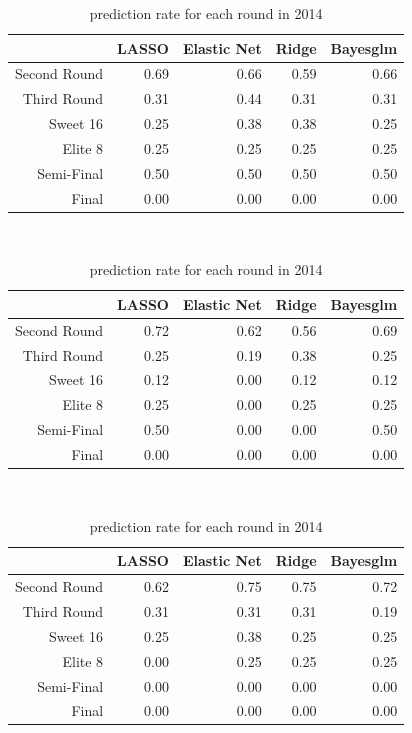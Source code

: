 \documentclass{article} %
\begin{document}
\begin{table}[H]
\centering
{\small
\begin{tabular}{rrrrr}
  \hline
 & LASSO & Elastic Net & Ridge & Bayesglm \\ 
  \hline
Second Round & 0.69 & 0.66 & 0.59 & 0.66 \\ 
  Third Round & 0.31 & 0.44 & 0.31 & 0.31 \\ 
  Sweet 16 & 0.25 & 0.38 & 0.38 & 0.25 \\ 
  Elite 8 & 0.25 & 0.25 & 0.25 & 0.25 \\ 
  Semi-Final & 0.50 & 0.50 & 0.50 & 0.50 \\ 
  Final & 0.00 & 0.00 & 0.00 & 0.00 \\ 
   \hline
\end{tabular}
}
\caption{prediction rate for each round in 2012}\ 

\centering
{\small
\begin{tabular}{rrrrr}
  \hline
 & LASSO & Elastic Net & Ridge & Bayesglm \\ 
  \hline
Second Round & 0.72 & 0.62 & 0.56 & 0.69 \\ 
  Third Round & 0.25 & 0.19 & 0.38 & 0.25 \\ 
  Sweet 16 & 0.12 & 0.00 & 0.12 & 0.12 \\ 
  Elite 8 & 0.25 & 0.00 & 0.25 & 0.25 \\ 
  Semi-Final & 0.50 & 0.00 & 0.00 & 0.50 \\ 
  Final & 0.00 & 0.00 & 0.00 & 0.00 \\ 
   \hline
\end{tabular}
}
\caption{prediction rate for each round in 2013}\ 

\centering
{\small
\begin{tabular}{rrrrr}
  \hline
 & LASSO & Elastic Net & Ridge & Bayesglm \\ 
  \hline
Second Round & 0.62 & 0.75 & 0.75 & 0.72 \\ 
  Third Round & 0.31 & 0.31 & 0.31 & 0.19 \\ 
  Sweet 16 & 0.25 & 0.38 & 0.25 & 0.25 \\ 
  Elite 8 & 0.00 & 0.25 & 0.25 & 0.25 \\ 
  Semi-Final & 0.00 & 0.00 & 0.00 & 0.00 \\ 
  Final & 0.00 & 0.00 & 0.00 & 0.00 \\ 
   \hline
\end{tabular}
}
\caption{prediction rate for each round in 2014}\ 


\end{table}
\end{document}
